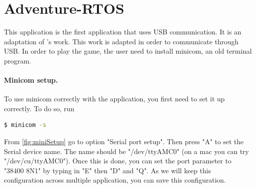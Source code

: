 \documentclass[12pt,a4paper]{report}
\begin{document}
\section{Adventure-RTOS}
\label{sec:ar}
This application is the first application that uses USB communication. It is an adaptation of \cite{adventure}'s work. This work is adapted in order to communicate through USB. In order to play the game, the user need to install minicom, an old terminal program.\newline
\paragraph{Minicom setup.} To use minicom correctly with the application, you first need to set it up correctly. To do so, run 
\begin{lstlisting}[language=bash]
$ minicom -s
\end{lstlisting}
From \ref{fig:miniSetup} go to option "Serial port setup". Then press "A" to set the Serial device name. The name should be "/dev/ttyAMC0" (on a mac you can try "/dev/cu/ttyAMC0"). Once this is done, you can set the port parameter to "38400 8N1" by typing in "E" then "D" and "Q". As we will keep this configuration across multiple application, you can save this configuration.
\end{document}
